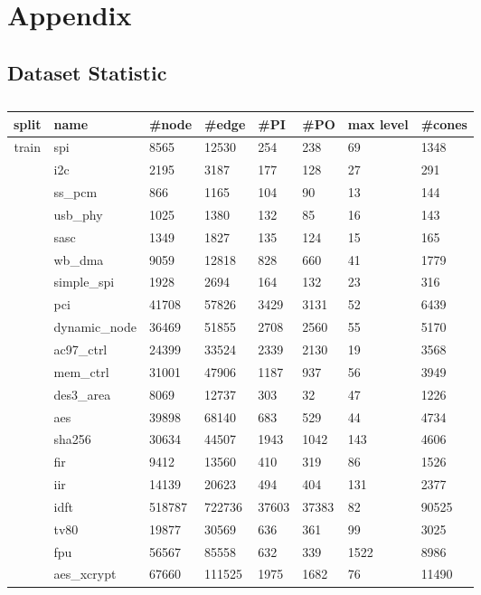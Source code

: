 \newpage
\section{Appendix}

\subsection{Dataset Statistic}
\label{sec:Dataset_Statistic}

\begin{table}[H]
\caption{}
\centering
\begin{tabular}{@{}c|l|llllll@{}}
\toprule
split & name & \#node & \#edge & \#PI & \#PO & max level & \#cones \\ \midrule
\multirow{24}{*}{train} & spi & 8565 & 12530 & 254 & 238 & 69 & 1348 \\
 & i2c & 2195 & 3187 & 177 & 128 & 27 & 291 \\
 & ss\_pcm & 866 & 1165 & 104 & 90 & 13 & 144 \\
 & usb\_phy & 1025 & 1380 & 132 & 85 & 16 & 143 \\
 & sasc & 1349 & 1827 & 135 & 124 & 15 & 165 \\
 & wb\_dma & 9059 & 12818 & 828 & 660 & 41 & 1779 \\
 & simple\_spi & 1928 & 2694 & 164 & 132 & 23 & 316 \\
 & pci & 41708 & 57826 & 3429 & 3131 & 52 & 6439 \\
 & dynamic\_node & 36469 & 51855 & 2708 & 2560 & 55 & 5170 \\
 & ac97\_ctrl & 24399 & 33524 & 2339 & 2130 & 19 & 3568 \\
 & mem\_ctrl & 31001 & 47906 & 1187 & 937 & 56 & 3949 \\
 & des3\_area & 8069 & 12737 & 303 & 32 & 47 & 1226 \\
 & aes & 39898 & 68140 & 683 & 529 & 44 & 4734 \\
 & sha256 & 30634 & 44507 & 1943 & 1042 & 143 & 4606 \\
 & fir & 9412 & 13560 & 410 & 319 & 86 & 1526 \\
 & iir & 14139 & 20623 & 494 & 404 & 131 & 2377 \\
 & idft & 518787 & 722736 & 37603 & 37383 & 82 & 90525 \\
 & tv80 & 19877 & 30569 & 636 & 361 & 99 & 3025 \\
 & fpu & 56567 & 85558 & 632 & 339 & 1522 & 8986 \\
 & aes\_xcrypt & 67660 & 111525 & 1975 & 1682 & 76 & 11490 \\

\end{tabular}
\end{table}

